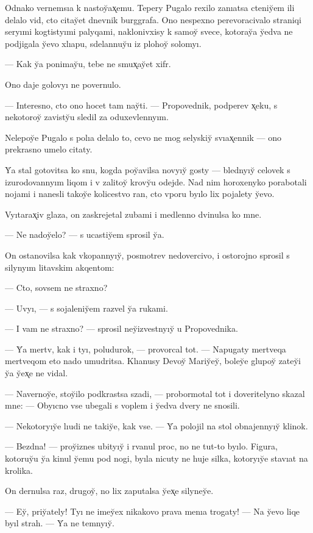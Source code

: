 \documentclass[10pt]{book}
\begin{document}
Odnako vernemsıa k nastoy̆ax̨emu. Tepery Pugalo rexilo zanıatsa cteniy̆em ili delalo vid, cto citay̆et dnevnik burggrafa. Ono nespexno perevoracivalo straniqi seryımi kogtistyımi palyqami, naklonivxisy k samoy̆ svece, kotoray̆a y̆edva ne podjigala y̆evo xlıapu, sdelannuy̆u iz plohoy̆ solomyı.

— Kak y̆a ponimay̆u, tebe ne smux̨ay̆et xifr.

Ono daje golovyı ne povernulo.

— Interesno, cto ono hocet tam nay̆ti. — Propovednik, podperev x̨eku, s nekotoroy̆ zavisty̆u sledil za oduxevlennyım.

Nelepoy̆e Pugalo s polıa delalo to, cevo ne mog selyskiy̆ svıax̨ennik — ono prekrasno umelo citaty.

Y̆a stal gotovitsa ko snu, kogda poy̆avilsa novyıy̆ gosty — blednyıy̆ celovek s izurodovannyım liqom i v zalitoy̆ krovy̆u odejde. Nad nim horoxenyko porabotali nojami i nanesli takoy̆e kolicestvo ran, cto vporu byılo lix pojalety y̆evo.

Vyıtarax̨iv glaza, on zaskrejetal zubami i medlenno dvinulsa ko mne.

— Ne nadoy̆elo? — s ucastiy̆em sprosil y̆a.

On ostanovilsa kak vkopannyıy̆, posmotrev nedovercivo, i ostorojno sprosil s silynyım litavskim akqentom:

— Cto, sovsem ne straxno?

— Uvyı, — s sojaleniy̆em razvel y̆a rukami.

— I vam ne straxno? — sprosil ney̆izvestnyıy̆ u Propovednika.

— Y̆a mertv, kak i tyı, poludurok, — provorcal tot. — Napugaty mertveqa mertveqom eto nado umudritsa. Klıanusy Devoy̆ Mariy̆ey̆, boley̆e glupoy̆ zatey̆i y̆a y̆ex̨e ne vidal.

— Navernoy̆e, stoy̆ilo podkrastsa szadi, — probormotal tot i doveritelyno skazal mne: — Obyıcno vse ubegali s voplem i y̆edva dvery ne snosili.

— Nekotoryıy̆e lıudi ne takiy̆e, kak vse. — Y̆a polojil na stol obnajennyıy̆ klinok.

— Bezdna! — proy̆iznes ubityıy̆ i rvanul proc, no ne tut-to byılo. Figura, kotoruy̆u y̆a kinul y̆emu pod nogi, byıla nicuty ne huje silka, kotoryıy̆e stavıat na krolika.

On dernulsa raz, drugoy̆, no lix zaputalsa y̆ex̨e silyney̆e.

— Ey̆, priy̆ately! Tyı ne imey̆ex nikakovo prava menıa trogaty! — Na y̆evo liqe byıl strah. — Y̆a ne temnyıy̆.
\end{document}
